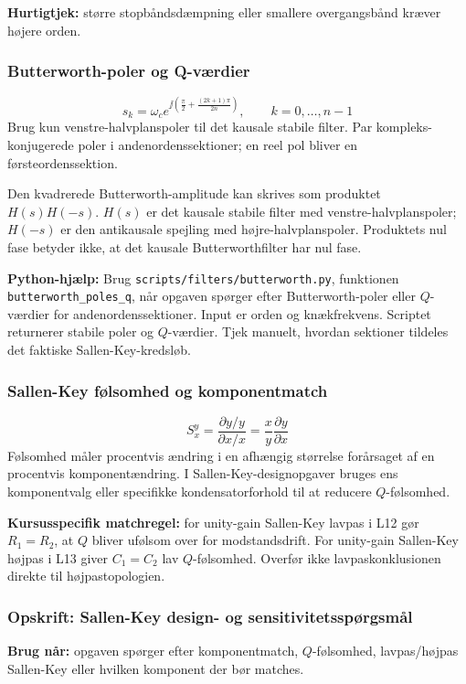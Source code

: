 \textbf{Hurtigtjek:} større stopbåndsdæmpning eller smallere overgangsbånd kræver højere orden.

\subsubsection{Butterworth-poler og Q-værdier}
\[
s_k=\omega_c e^{\jj\left(\frac{\pi}{2}+\frac{(2k+1)\pi}{2n}\right)},\qquad k=0,\ldots,n-1
\]
Brug kun venstre-halvplanspoler til det kausale stabile filter. Par kompleks-konjugerede poler i andenordenssektioner; en reel pol bliver en førsteordenssektion.

Den kvadrerede Butterworth-amplitude kan skrives som produktet \(H(s)H(-s)\). \(H(s)\) er det kausale stabile filter med venstre-halvplanspoler; \(H(-s)\) er den antikausale spejling med højre-halvplanspoler. Produktets nul fase betyder ikke, at det kausale Butterworthfilter har nul fase.

\textbf{Python-hjælp:} Brug \texttt{scripts/filters/butterworth.py}, funktionen \texttt{butterworth\_poles\_q}, når opgaven spørger efter Butterworth-poler eller \(Q\)-værdier for andenordenssektioner. Input er orden og knækfrekvens. Scriptet returnerer stabile poler og \(Q\)-værdier. Tjek manuelt, hvordan sektioner tildeles det faktiske Sallen-Key-kredsløb.

\subsubsection{Sallen-Key følsomhed og komponentmatch}
\[
S_x^y=\frac{\partial y/y}{\partial x/x}=\frac{x}{y}\frac{\partial y}{\partial x}
\]
Følsomhed måler procentvis ændring i en afhængig størrelse forårsaget af en procentvis komponentændring. I Sallen-Key-designopgaver bruges ens komponentvalg eller specifikke kondensatorforhold til at reducere \(Q\)-følsomhed.

\textbf{Kursusspecifik matchregel:} for unity-gain Sallen-Key lavpas i L12 gør \(R_1=R_2\), at \(Q\) bliver ufølsom over for modstandsdrift. For unity-gain Sallen-Key højpas i L13 giver \(C_1=C_2\) lav \(Q\)-følsomhed. Overfør ikke lavpaskonklusionen direkte til højpastopologien.

\subsubsection{Opskrift: Sallen-Key design- og sensitivitetsspørgsmål}
\textbf{Brug når:} opgaven spørger efter komponentmatch, \(Q\)-følsomhed, lavpas/højpas Sallen-Key eller hvilken komponent der bør matches.

